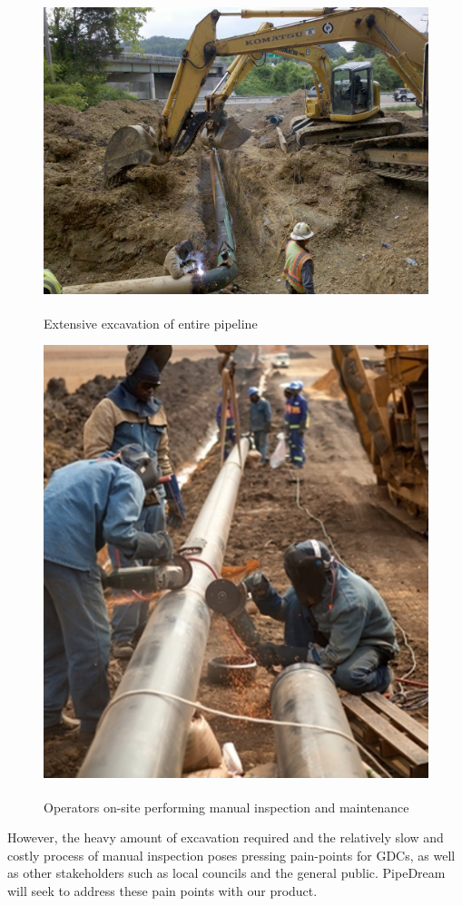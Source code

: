 \documentclass[11pt]{article}		%
\newlength{\imageheight}	 %
\newcommand{\supercite}[1]{\textsuperscript{\cite{#1}}}		%
\begin{document}
		\begin{figure}[h]
					\centering
					\begin{multicols}{2}
						\includegraphics[height=\imageheight]{Pipeline Excavation.jpg}
						\caption{Extensive excavation of entire pipeline\supercite{sönnichsen_5_2021}}
						\label{excavation}
						\columnbreak
						\includegraphics[height=\imageheight]{Pipeline Repair.jpg}
						\caption{Operators on-site performing manual inspection and maintenance\supercite{sönnichsen_5_2021}}
						\label{pipelineRepair}
					\end{multicols}
				\end{figure}
		\vspace{-0.5cm}
		However, the heavy amount of excavation required and the relatively slow and costly process of manual inspection poses pressing pain-points for GDCs, as well as other stakeholders such as local councils and the general public. PipeDream will seek to address these pain points with our product. 
\end{document}
